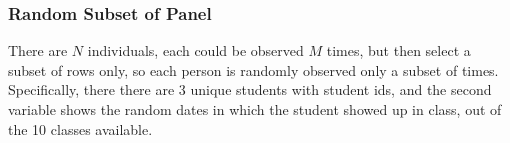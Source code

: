 \documentclass[
]{book}
\newenvironment{Shaded}{\begin{snugshade}}{\end{snugshade}}
\newcommand{\CommentTok}[1]{\textcolor[rgb]{0.56,0.35,0.01}{\textit{#1}}}
\newcommand{\DataTypeTok}[1]{\textcolor[rgb]{0.13,0.29,0.53}{#1}}
\newcommand{\DecValTok}[1]{\textcolor[rgb]{0.00,0.00,0.81}{#1}}
\newcommand{\KeywordTok}[1]{\textcolor[rgb]{0.13,0.29,0.53}{\textbf{#1}}}
\newcommand{\NormalTok}[1]{#1}
\newcommand{\OperatorTok}[1]{\textcolor[rgb]{0.81,0.36,0.00}{\textbf{#1}}}
\newcommand{\OtherTok}[1]{\textcolor[rgb]{0.56,0.35,0.01}{#1}}
\newcommand{\StringTok}[1]{\textcolor[rgb]{0.31,0.60,0.02}{#1}}
\begin{document}
\hypertarget{random-subset-of-panel}{%
\subsubsection{Random Subset of Panel}\label{random-subset-of-panel}}

There are \(N\) individuals, each could be observed \(M\) times, but then select a subset of rows only, so each person is randomly observed only a subset of times. Specifically, there there are 3 unique students with student ids, and the second variable shows the random dates in which the student showed up in class, out of the 10 classes available.

\begin{Shaded}
\end{Shaded}
\end{document}
